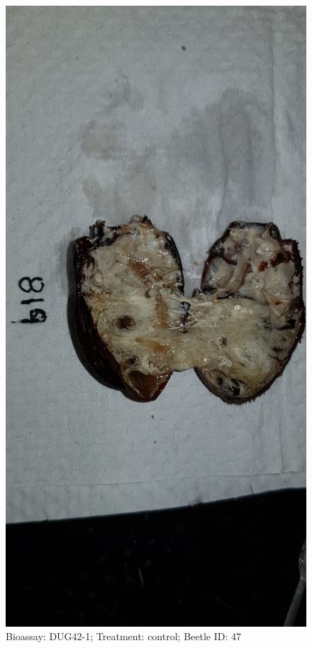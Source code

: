 \documentclass[11pt]{scrartcl}
\begin{document}
\begin{figure}[h!]
    \centering
    \includegraphics[width=\linewidth, height=\textheight, keepaspectratio]{uploads/btl.pm_image.bb8525578c5296ca.4475673432203831395f5265702d3120636f6e74726f6c2e6a7067.jpg}
    \caption{Bioassay: DUG42-1; Treatment: control; Beetle ID: 47}
\end{figure}
\clearpage
\end{document}
